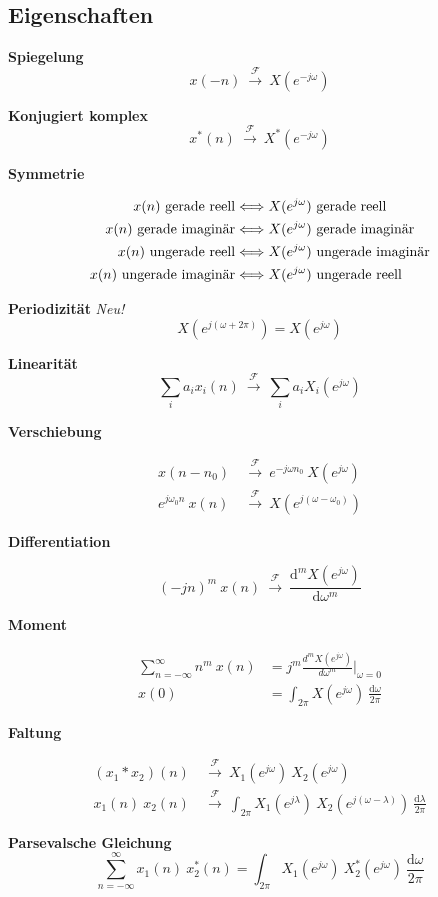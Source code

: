 \documentclass[10pt,a4paper]{article}
\newcommand{\fancyformula}[2]{
	\small
	\raggedright\sffamily\textbf{#1}
	#2
}
\newcommand{\ftransform}{
	~\xrightarrow{~\mathcal{F}~}~
}
\begin{document}
\subsection*{Eigenschaften}
\begin{multicols}{2}
	
\fancyformula{Spiegelung}{\[ x(-n)\ftransform X \left(e^{-j\omega} \right) \]}
\fancyformula{Konjugiert komplex}{\[ x^*(n) \ftransform X^* \left(e^{-j\omega} \right)\]}
\fancyformula{Symmetrie}{
\begin{align*}
	x(n) \textnormal{ gerade reell} &\Longleftrightarrow X(e^{j\omega}) \textnormal{ gerade reell} \\
	x(n) \textnormal{ gerade imaginär} &\Longleftrightarrow X(e^{j\omega}) \textnormal{ gerade imaginär} \\
	x(n) \textnormal{ ungerade reell} &\Longleftrightarrow X(e^{j\omega}) \textnormal{ ungerade imaginär} \\
	x(n) \textnormal{ ungerade imaginär} &\Longleftrightarrow X(e^{j\omega}) \textnormal{ ungerade reell} \\
\end{align*}
}
\fancyformula{Periodizität}{\textit{Neu!} \[ X \left(e^{j(\omega + 2\pi)}\right) = X(e^{j\omega}) \]}
\fancyformula{Linearität}{\[ \sum_{i} a_i x_i(n) \ftransform \sum_{i} a_i X_i\left(e^{j\omega} \right)\]}
\fancyformula{Verschiebung}{
\begin{align*}
	x(n - n_0) &\ftransform e^{-j\omega n_0} ~ X\left(e^{j\omega} \right) \\
	e^{j\omega_0 n} ~ x(n) &\ftransform X \left(e^{j (\omega - \omega_0)} \right)
\end{align*}
}
\fancyformula{Differentiation}{
\[
	(-jn)^m ~ x(n) \ftransform \frac{\mathrm d^m X(e^{j\omega})}{\mathrm d\omega^m}
\]
}
\fancyformula{Moment}{
\begin{align*}
	\sum_{n=-\infty}^{\infty} n^m ~ x(n) &= j^m \frac{d^m X \left(e^{j\omega} \right)}{d\omega^m} \bigg|_{\omega=0} \\
	x(0) &= \int_{2\pi} X \left(e^{j\omega} \right) ~ \frac{\mathrm d\omega}{2\pi}
\end{align*}	
}
\fancyformula{Faltung}{
\begin{align*}
	(x_1 \ast x_2)(n) &\ftransform X_1 \left(e^{j\omega} \right) ~ X_2 \left(e^{j\omega} \right)\\
	x_1(n) ~ x_2(n) &\ftransform \int_{2\pi} X_1 \left(e^{j\lambda} \right) ~ X_2 \left(e^{j (\omega - \lambda)} \right) ~ \frac{\mathrm d\lambda}{2\pi}
\end{align*}
}
\fancyformula{Parsevalsche Gleichung}{\[ \sum_{n=-\infty}^{\infty}x_1(n) ~ x_2^*(n) = \int_{2 \pi} X_1 \left(e^{j\omega} \right) ~ X_2^* \left(e^{j\omega} \right) ~ \frac{\mathrm d\omega}{2\pi} \]}
\end{multicols}
\end{document}
